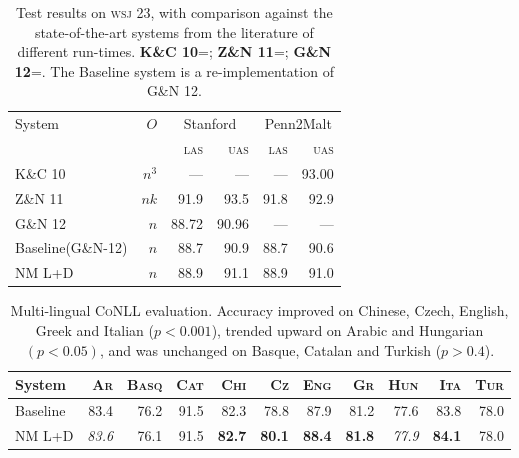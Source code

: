 \documentclass[11pt,letterpaper]{article}
\newcommand{\las}{\textsc{las}\xspace}
\newcommand{\uas}{\textsc{uas}\xspace}
\newcommand{\wsj}{\textsc{wsj}\xspace}
\begin{document}
\begin{table}
    \centering
    \small
    \begin{tabular}{l|r|rr|rr}
        \hline 
System  &   $O$ &  \multicolumn{2}{c}{Stanford} & \multicolumn{2}{|c}{Penn2Malt} \\
        &       &  \las  & \uas  & \las & \uas \\
        \hline \hline
K\&C 10  & $n^3$ & ---   & ---   & ---  & 93.00 \\
Z\&N 11  & $nk$  & 91.9  & 93.5  & 91.8 & 92.9 \\
G\&N 12  & $n$   & 88.72 & 90.96 & ---  & --- \\
        \hline
Baseline(G\&N-12)   & $n$ & 88.7 & 90.9 & 88.7  & 90.6 \\
NM L+D      & $n$ & 88.9 & 91.1 & 88.9  & 91.0 \\
\hline
    \end{tabular}
    \caption{\small Test results on \wsj 23, with comparison against the
        state-of-the-art systems from the literature of different run-times.
        \textbf{K\&C 10}=\citet{koo:10}; \textbf{Z\&N 11}=\citet{zhang:11};
        \textbf{G\&N 12}=\citet{goldberg:12}. The Baseline system is a re-implementation
             of G\&N 12.\label{tab:eval}}
\end{table}

\begin{table*}
    \centering
    \small
    \begin{tabular}{l|rrrrrrrrrr}
        \hline
        System & \textsc{Ar} & \textsc{Basq} & \textsc{Cat} & \textsc{Chi} & \textsc{Cz} & \textsc{Eng} & \textsc{Gr} & \textsc{Hun} & \textsc{Ita} & \textsc{Tur} \\
        \hline \hline
      Baseline & 83.4 & 76.2 & 91.5 & 82.3  & 78.8  & 87.9 & 81.2 & 77.6 & 83.8 & 78.0 \\
        NM L+D & \emph{83.6} & 76.1 & 91.5 & \textbf{82.7} & \textbf{80.1} & \textbf{88.4} & \textbf{81.8} & \emph{77.9} & \textbf{84.1} & 78.0 \\
    \end{tabular}
    \caption{\small
        Multi-lingual \textsc{CoNLL} evaluation. Accuracy improved
        on Chinese, Czech, English, Greek and Italian ($p < 0.001$), trended
        upward on Arabic and Hungarian $(p < 0.05)$, and was unchanged on
        Basque, Catalan and Turkish ($p > 0.4$).
    \label{tab:conll}}
\end{table*}
\end{document}
